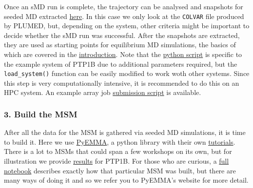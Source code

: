 Once an sMD run is complete, the trajectory can be analysed and
snapshots for seeded MD extracted
\href{02_trajectory_analysis.ipynb}{here}. In this case we only look at
the \texttt{COLVAR} file produced by PLUMED, but, depending on the
system, other criteria might be important to decide whether the sMD run
was successful. After the snapshots are extracted, they are used as
starting points for equilibrium MD simulations, the basics of which are
covered in the \href{../01_introduction}{introduction}. Note that the
\href{02_run_seededMD.py}{python script} is specific to the example
system of PTP1B due to additional parameters required, but the
\texttt{load\_system()} function can be easily modified to work woth
other systems. Since this step is very computationally intensive, it is
recommended to do this on an HPC system. An example array job
\href{02_run_seeded_MD_LSF.sh}{submission script} is available.

\hypertarget{build-the-msm}{%
\subsubsection{3. Build the MSM}\label{build-the-msm}}

After all the data for the MSM is gathered via seeded MD simulations, it
is time to build it. Here we use
\href{http://emma-project.org/latest/}{PyEMMA}, a python library with
their own
\href{http://emma-project.org/latest/tutorial.html}{tutorials}. There is
a lot to MSMs that could span a few workshops on its own, but for
illustration we provide \href{03_msm.md}{results} for PTP1B. For those
who are curious, a \href{03_msm_full.ipynb}{full notebook} describes
exactly how that particular MSM was built, but there are many ways of
doing it and so we refer you to PyEMMA's website for more detail.
